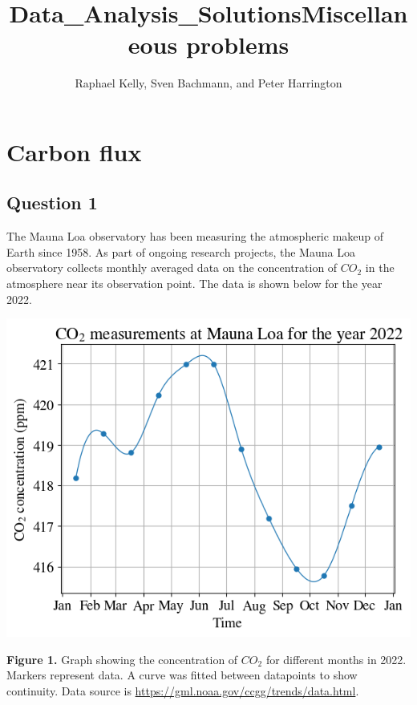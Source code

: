 \documentclass{exam}
\title{Data\_Analysis\_Solutions}
\title{Miscellaneous problems}
\date{}
\author{Raphael Kelly, Sven Bachmann, and Peter Harrington}
\begin{document}
\maketitle

\section{Carbon flux}
\subsection*{Question 1}
\label{q1}

The Mauna Loa observatory has been measuring the atmospheric makeup of Earth since 1958. As part of ongoing research projects, the Mauna Loa observatory collects monthly averaged data on the concentration of $CO_2$ in the atmosphere near its observation point. The data is shown below for the year 2022.

\begin{center}
        \includegraphics[scale=0.7]{co2measurementsmaunoloa.png}
        
        \textbf{Figure 1.} Graph showing the concentration of $CO_2$ for different months in 2022. Markers represent data. A curve was fitted between datapoints to show continuity. Data source is \url{https://gml.noaa.gov/ccgg/trends/data.html}.
        \end{center}
\end{document}
